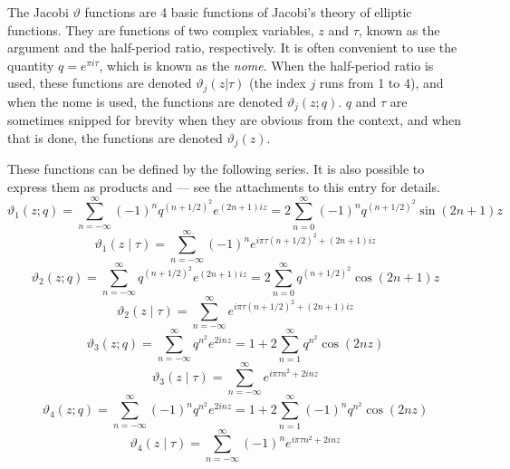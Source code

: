 \documentclass[12pt]{article}
\begin{document}
The Jacobi $\vartheta$ functions are 4 basic functions of Jacobi's theory of elliptic functions.  They are functions of two complex variables, $z$ and $\tau$, known as the argument and the half-period ratio, respectively.  It is often convenient to use the quantity $q=e^{\pi i \tau}$, which is known as the \emph{nome}.   When the half-period ratio is used, these functions are denoted $\vartheta_{j}(z|\tau)$ (the index $j$ runs from 1 to 4), and when the nome is used, the functions are denoted $\vartheta_{j}(z;q)$.  $q$ and $\tau$ are sometimes snipped for brevity when they are obvious from the context, and when that is done, the functions are denoted $\vartheta_{j}(z)$.

These functions can be defined by the following series.  It is also possible to express them as products and  --- see the attachments to this entry for details.
\begin{equation}
\vartheta_{1}(z;q)=\sum_{n=-\infty}^{\infty} (-1)^n q^{(n+1/2)^2} e^{(2n+1)iz}  = 2 \sum_{n=0}^\infty (-1)^n  q^{(n+1/2)^2} \sin (2n+1) z
\end{equation}
\begin{equation}
\vartheta_{1}(z \mid \tau)=\sum_{n=-\infty}^{\infty} (-1)^n e^{i \pi \tau (n+1/2)^2 +(2n+1)iz}
\end{equation}
\begin{equation}
\vartheta_{2}(z;q)=\sum_{n=-\infty}^{\infty} q^{(n+1/2)^2} e^{(2n+1)iz} = 2 \sum_{n=0}^\infty q^{(n+1/2)^2} \cos (2n+1) z
\end{equation}
\begin{equation}
\vartheta_{2}(z \mid \tau)=\sum_{n=-\infty}^{\infty} e^{i \pi \tau (n+1/2)^2 +(2n+1)iz}
\end{equation}
\begin{equation}
\vartheta_{3}(z;q)=\sum_{n=-\infty}^{\infty} q^{n^2} e^{2inz} = 1 + 2 \sum_{n=1}^\infty q^{n^2} \cos (2nz)
\end{equation}
\begin{equation}
\vartheta_{3}(z \mid \tau)=\sum_{n=-\infty}^{\infty} e^{i \pi \tau n^2 + 2inz}
\end{equation}
\begin{equation}
\vartheta_{4}(z;q)=\sum_{n=-\infty}^{\infty} (-1)^{n} q^{n^2} e^{2inz} = 1 + 2 \sum_{n=1}^\infty (-1)^{n} q^{n^2} \cos (2nz)
\end{equation}
\begin{equation}
\vartheta_{4}(z \mid \tau)=\sum_{n=-\infty}^{\infty} (-1)^{n} e^{i \pi \tau n^2 + 2inz}
\end{equation}
\end{document}

